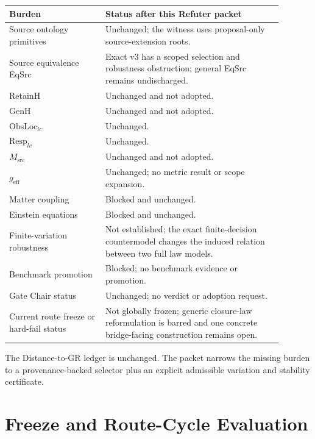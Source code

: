 \documentclass[11pt]{article}
\begin{document}
\begin{longtable}{p{0.31\linewidth}p{0.58\linewidth}}
\toprule
Burden & Status after this Refuter packet \\
\midrule
Source ontology primitives & Unchanged; the witness uses proposal-only source-extension roots. \\
Source equivalence EqSrc & Exact v3 has a scoped selection and robustness obstruction; general EqSrc remains undischarged. \\
RetainH & Unchanged and not adopted. \\
GenH & Unchanged and not adopted. \\
\(\mathrm{ObsLoc}_{lc}\) & Unchanged. \\
\(\mathrm{Resp}_{lc}\) & Unchanged. \\
\(M_{\mathrm{src}}\) & Unchanged and not adopted. \\
\(g_{\mathrm{eff}}\) & Unchanged; no metric result or scope expansion. \\
Matter coupling & Blocked and unchanged. \\
Einstein equations & Blocked and unchanged. \\
Finite-variation robustness & Not established; the exact finite-decision countermodel changes the induced relation between two full law models. \\
Benchmark promotion & Blocked; no benchmark evidence or promotion. \\
Gate Chair status & Unchanged; no verdict or adoption request. \\
Current route freeze or hard-fail status & Not globally frozen; generic closure-law reformulation is barred and one concrete bridge-facing construction remains open. \\
\bottomrule
\end{longtable}

The Distance-to-GR ledger is unchanged. The packet narrows the missing burden
to a provenance-backed selector plus an explicit admissible variation and
stability certificate.

\section{Freeze and Route-Cycle Evaluation}
\end{document}
